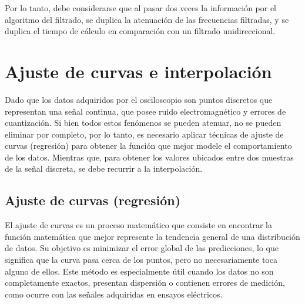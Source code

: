 Por lo tanto, debe considerarse que al pasar dos veces la información por el algoritmo del filtrado, se duplica la atenuación de las frecuencias filtradas, y se duplica el tiempo de cálculo en comparación con un filtrado unidireccional.

\section{Ajuste de curvas e interpolación}
\vspace{3\baselineskip}

Dado que los datos adquiridos por el osciloscopio son puntos discretos que representan una señal continua, que posee ruido electromagnético y errores de cuantización. Si bien todos estos fenómenos se pueden atenuar, no se pueden eliminar por completo, por lo tanto, es necesario aplicar técnicas de ajuste de curvas (regresión) para obtener la función que mejor modele el comportamiento de los datos. Mientras que, para obtener los valores ubicados entre dos muestras de la señal discreta, se debe recurrir a la interpolación.

\subsection{Ajuste de curvas (regresión)}

El ajuste de curvas \cite{Chapra2015} es un proceso matemático que consiste en encontrar la función matemática que mejor represente la tendencia general de una distribución de datos. Su objetivo es minimizar el error global de las predicciones, lo que significa que la curva pasa cerca de los puntos, pero no necesariamente toca alguno de ellos. Este método es especialmente útil cuando los datos no son completamente exactos, presentan dispersión o contienen errores de medición, como ocurre con las señales adquiridas en ensayos eléctricos.


